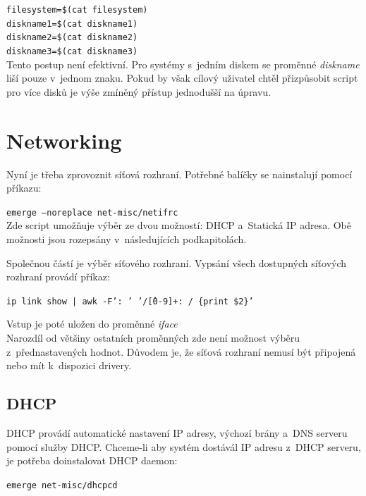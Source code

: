 \documentclass[12pt,a4paper,twoside,]{article}
\begin{document}
{{{{{{\texttt{filesystem=\$(cat filesystem)}\\
\hspace*{1.5em}\texttt{diskname1=\$(cat diskname1)}\\
\hspace*{1.5em}\texttt{diskname2=\$(cat diskname2)}\\
\hspace*{1.5em}\texttt{diskname3=\$(cat diskname3)}\\

\hspace*{-1.5em}Tento postup není efektivní. Pro systémy s~jedním diskem se proměnné \textit{diskname} liší pouze v~jednom znaku. Pokud by však cílový uživatel chtěl přizpůsobit script pro více disků je výše zmíněný přístup jednodušší na úpravu.
\newpage

\section{\textsf{Networking}}
Nyní je třeba zprovoznit síťová rozhraní. Potřebné balíčky se nainstalují pomocí příkazu:

\texttt{emerge --noreplace net-misc/netifrc}\\


\hspace{-1.5em}Zde script umožňuje výběr ze dvou možností: DHCP a~Statická IP adresa. Obě možnosti jsou rozepsány v~následujících podkapitolách.

\hspace{-1.5em}Společnou částí je výběr síťového rozhraní. Vypsání všech dostupných síťových rozhraní provádí příkaz:

\texttt{ip link show | awk -F': ' '/\^[0-9]+: / \{print \$2\}'}

\hspace{-1.5em}Vstup je poté uložen do proměnné \textit{iface}\\
Narozdíl od většiny ostatních proměnných zde není možnost výběru z~přednastavených hodnot. Důvodem je, že síťová rozhraní nemusí být připojená nebo mít k~dispozici drivery.
\subsection{\textsf{DHCP}}
DHCP provádí automatické nastavení IP adresy, výchozí brány a~DNS serveru pomocí služby DHCP.
Chceme-li aby systém dostávál IP adresu z~DHCP serveru, je potřeba doinstalovat DHCP daemon:

\texttt{emerge net-misc/dhcpcd}

}}}}}}
\end{document}
